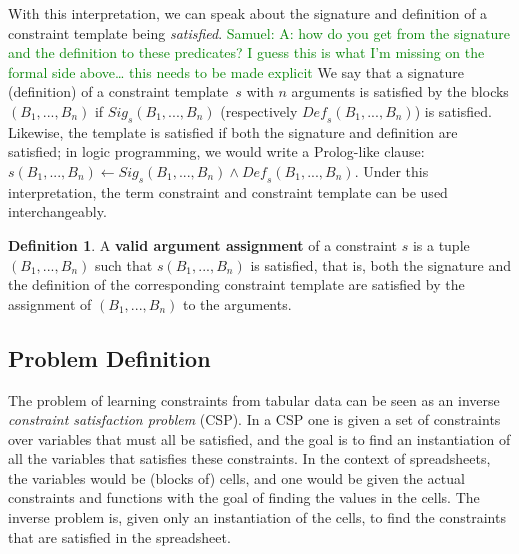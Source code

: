 \documentclass{IEEEtran}
\newcommand{\samuel}[1]{\textcolor{green}{{\sc Samuel:} #1}\xspace}
\newcommand{\tias}[1]{\textcolor{blue}{{\sc Tias:} #1}\xspace}
\newcommand{\format}[1]{\textit{#1}\xspace}
\theoremstyle{definition}
\newtheorem{definition}{Definition}
\begin{document}
\newcommand{\sigc}{\ensuremath{\format{Sig}_s}}
\newcommand{\defc}{\ensuremath{\format{Def}_s}}
With this interpretation, we can speak about the signature and definition of a constraint template being \textit{satisfied}.
\samuel{A: how do you get from the signature and the definition to these predicates? I guess this is what I'm missing on the formal side above… this needs to be made explicit}
We say that a signature (definition) of a constraint template~$s$ with $n$ arguments is satisfied by the blocks $(B_1, ..., B_n)$ if $\sigc(B_1, ..., B_n)$ (respectively $\defc(B_1, ..., B_n)$) is satisfied.
Likewise, the template is satisfied if both the signature and definition are satisfied; in logic programming, we would write a Prolog-like clause: $s(B_1, ..., B_n) \leftarrow \sigc(B_1, ..., B_n) \wedge \defc(B_1, ..., B_n)$.
Under this interpretation, the term constraint and constraint template can be used interchangeably.

\begin{definition}
A \textbf{valid argument assignment} of a constraint $s$ is a tuple $(B_1, ..., B_n)$ such that $s(B_1, ..., B_n)$ is satisfied, that is, both the signature and the definition of the corresponding constraint template are satisfied by the assignment of $(B_1, ..., B_n)$ to the arguments.
\end{definition}





\subsection{Problem Definition}\label{sec:problem_statement}
The problem of learning constraints from tabular data can be seen as an inverse {\em constraint satisfaction problem} (CSP).
In a CSP one is given a set of constraints over variables that must all be satisfied, and the goal is to find an instantiation of all the variables that satisfies these constraints. In the context of spreadsheets, the variables would be (blocks of) cells, and one would be given the actual constraints and functions with the goal of finding the values in the cells.
The inverse problem is, given only an instantiation of the cells, to find the constraints that are satisfied in the spreadsheet.
\end{document}
